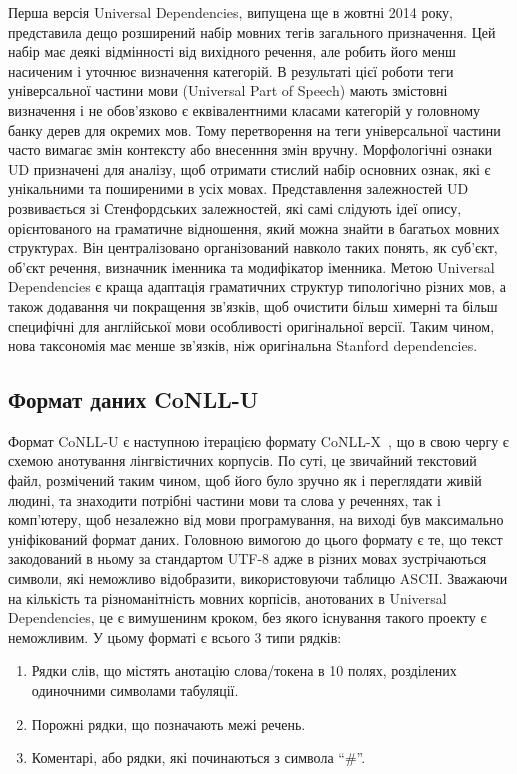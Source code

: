 Перша версія Universal Dependencies, випущена ще в жовтні 2014 року, представила дещо розширений набір мовних тегів загального призначення. Цей набір має деякі відмінності від вихідного речення, але робить його менш насиченим і уточнює визначення категорій. В результаті цієї роботи теги універсальної частини мови (Universal Part of Speech) мають змістовні визначення і не обов'язково є еквівалентними класами категорій у головному банку дерев для окремих мов. Тому перетворення на теги універсальної частини часто вимагає змін контексту або внесенння змін вручну. Морфологічні ознаки UD призначені для аналізу, щоб отримати стислий набір основних ознак, які є унікальними та поширеними в усіх мовах. Представлення залежностей UD розвивається зі Стенфордських залежностей, які самі слідують ідеї опису, орієнтованого на граматичне відношення, який можна знайти в багатьох мовних структурах. Він централізовано організований навколо таких понять, як суб’єкт, об’єкт речення, визначник іменника та модифікатор іменника. Метою Universal Dependencies є краща адаптація граматичних структур типологічно різних мов, а також додавання чи покращення зв’язків, щоб очистити більш химерні та більш специфічні для англійської мови особливості оригінальної версії. Таким чином, нова таксономія має менше зв’язків, ніж оригінальна Stanford dependencies.

\subsection{Формат даних CoNLL-U}
Формат CoNLL-U є наступною ітерацією формату CoNLL-X~\cite{bib11},
що в свою чергу є схемою анотування лінгвістичних корпусів.
По суті, це звичайний текстовий файл, розмічений таким чином, щоб
його було зручно як і переглядати живій людині, та знаходити потрібні
частини мови та слова у реченнях, так і комп'ютеру, щоб незалежно
від мови програмування, на виході був максимально уніфікований формат даних.
Головною вимогою до цього формату є те, що текст закодований в ньому за
стандартом UTF-8 адже в різних мовах зустрічаються символи, які
неможливо відобразити, використовуючи таблицю ASCII. Зважаючи на
кількість та різноманітність мовних корпісів, анотованих в Universal Dependencies,
це є вимушенинм кроком, без якого існування такого проекту є неможливим.
У цьому форматі є всього 3 типи рядків:

\begin{enumerate}
    \item Рядки слів, що містять анотацію слова/токена в 10 полях, розділених одиночними символами табуляції.
    \item Порожні рядки, що позначають межі речень.
    \item Коментарі, або рядки, які починаються з символа ``\#''.
\end{enumerate}

